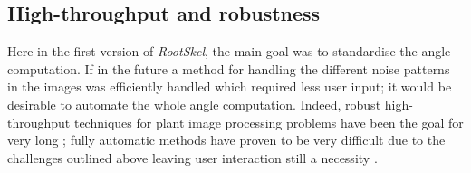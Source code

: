%
%
%


\subsection{High-throughput and robustness}

Here in the first version of \textit{RootSkel}, the main goal was to standardise the angle computation. If in the future  a method for handling the different noise patterns in the images was efficiently handled which required less user input; it would be desirable to automate the whole angle computation. Indeed, robust high-throughput techniques for plant image processing problems have been the goal for very long \cite{hartmann2011htpheno,diener2013automated,lee2018automated,plantCV}; fully automatic methods have proven to be very difficult due to the challenges outlined above leaving user interaction still a necessity \cite{pound2013rootnav}.

